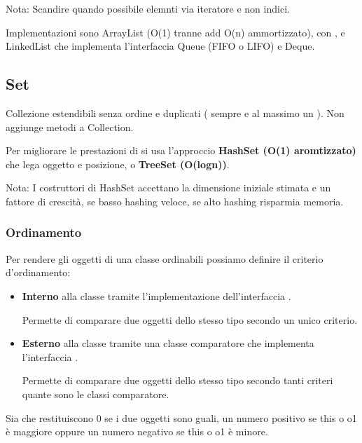 \medskip

Nota: Scandire quando possibile elemnti via iteratore e non indici.

\medskip

Implementazioni sono ArrayList (O(1) tranne add O(n) ammortizzato), con , e LinkedList che implementa l'interfaccia Queue (FIFO o LIFO) e Deque.

\subsection{Set}
Collezione estendibili senza ordine e duplicati ( sempre  e al massimo un ). Non aggiunge metodi a Collection.

Per migliorare le prestazioni di  si usa l'approccio \textbf{HashSet (O(1) aromtizzato)} che lega oggetto e posizione, o \textbf{TreeSet (O(logn))}.

Nota: I costruttori di HashSet accettano la dimensione iniziale stimata e un fattore di crescità, se basso hashing veloce, se alto hashing risparmia memoria.

\subsubsection{Ordinamento}
Per rendere gli oggetti di una classe ordinabili possiamo definire il criterio d'ordinamento:
\begin{itemize}
	\item \textbf{Interno} alla classe tramite l'implementazione dell'interfaccia .

	Permette di comparare due oggetti dello stesso tipo secondo un unico criterio.


	\item \textbf{Esterno} alla classe tramite una classe comparatore che implementa l'interfaccia .

	Permette di comparare due oggetti dello stesso tipo secondo tanti criteri quante sono le classi comparatore.

\end{itemize}

Sia  che  restituiscono 0 se i due oggetti sono guali, un numero positivo se this o o1 è maggiore oppure un numero negativo se this o o1 è minore.


